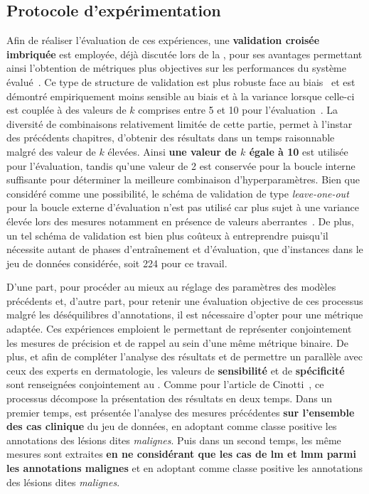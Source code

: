 \subsection{Protocole d'expérimentation}
Afin de réaliser l'évaluation de ces expériences, une \textbf{validation croisée imbriquée} est employée, déjà discutée lors de la , pour ses avantages permettant ainsi l'obtention de métriques plus objectives sur les performances du système évalué~\cite{Cawley2010}. Ce type de structure de validation est plus robuste face au biais~\cite{Cawley2010} et est démontré empiriquement moins sensible au biais et à la variance lorsque celle-ci est couplée à des valeurs de $k$ comprises entre 5 et 10 pour l'évaluation~\cite{James2013}. La diversité de combinaisons relativement limitée de cette partie, permet à l'instar des précédents chapitres, d'obtenir des résultats dans un temps raisonnable malgré des valeur de $k$ élevées. Ainsi \textbf{une valeur de $k$ égale à 10} est utilisée pour l'évaluation, tandis qu'une valeur de 2 est conservée pour la boucle interne suffisante pour déterminer la meilleure combinaison d'hyperparamètres. Bien que considéré comme une possibilité, le schéma de validation de type \textit{leave-one-out} pour la boucle externe d'évaluation n'est pas utilisé car plus sujet à une variance élevée lors des mesures notamment en présence de valeurs aberrantes~\cite{Bengio2004}. De plus, un tel schéma de validation est bien plus coûteux à entreprendre puisqu'il nécessite autant de phases d'entraînement et d'évaluation, que d'instances dans le jeu de données considérée, soit 224 pour ce travail.\par

D'une part, pour procéder au mieux au réglage des paramètres des modèles précédents et, d'autre part, pour retenir une évaluation objective de ces processus malgré les déséquilibres d'annotations, il est nécessaire d'opter pour une métrique adaptée. Ces expériences emploient le \textbf{\fscore{}} permettant de représenter conjointement les mesures de précision et de rappel au sein d'une même métrique binaire. De plus, et afin de compléter l'analyse des résultats et de permettre un parallèle avec ceux des experts en dermatologie, les valeurs de \textbf{sensibilité} et de \textbf{spécificité} sont renseignées conjointement au \fscore{}. Comme pour l'article de Cinotti~, ce processus décompose la présentation des résultats en deux temps. Dans un premier temps, est présentée l'analyse des mesures précédentes \textbf{sur l'ensemble des cas clinique} du jeu de données, en adoptant comme classe positive les annotations des lésions dites \textit{malignes}. Puis dans un second temps, les même mesures sont extraites \textbf{en ne considérant que les cas de \textbf{\gls{lm} et \gls{lmm}} parmi les annotations malignes} et en adoptant comme classe positive les annotations des lésions dites \textit{malignes}.\par

